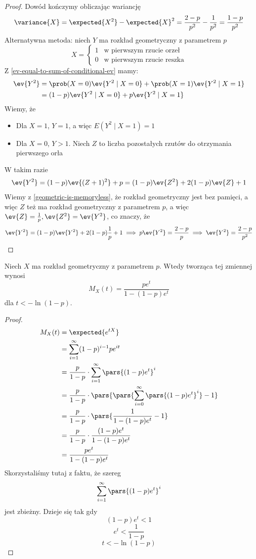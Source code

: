 \begin{proof}
	Dowód kończymy obliczając wariancję
	\[
		\variance{X} = \expected{X^2} - \expected{X}^2 = \frac{2-p}{p^2} - \frac{1}{p^2} = \frac{1-p}{p^2}
	\]
	Alternatywna metoda: niech \(Y\) ma rozkład geometryczny z parametrem \(p\)
	\[
		X = \begin{cases}
			1 & \text{w pierwszym rzucie orzeł}  \\
			0 & \text{w pierwszym rzucie reszka}
		\end{cases}
	\]
	Z \ref{ev-equal-to-sum-of-conditional-ev} mamy:
	\begin{align*}
		\ev{Y^2}
		 & = \prob(X = 0) \ev{Y^2 \mid X = 0} + \prob(X = 1) \ev{Y^2 \mid X = 1} \\
		 & = (1-p)\ev{Y^2 \mid X = 0} + p\ev{Y^2 \mid X = 1}                     \\
	\end{align*}
	Wiemy, że
	\begin{itemize}
		\item Dla \(X = 1\), \(Y = 1\), a więc \(E(Y^2 \mid X = 1) = 1\)
		\item Dla \(X = 0\), \(Y > 1\). Niech \(Z\) to liczba pozostałych rzutów do otrzymania pierwszego orła
	\end{itemize}
	W takim razie
	\[
		\ev{Y^2} = (1-p)\ev{(Z + 1)^2} + p = (1-p)\ev{Z^2} + 2(1-p)\ev{Z} + 1
	\]
	Wiemy z \ref{geometric-is-memoryless}, że rozkład geometryczny jest bez pamięci, a więc \(Z\) też ma rozkład geometryczny z parametrem \(p\), a więc \(\ev{Z} = \frac{1}{p}, \ev{Z^2} = \ev{Y^2}\), co znaczy, że
	\[
		\ev{Y^2} = (1-p)\ev{Y^2} + 2(1-p)\frac{1}{p} + 1 \implies p\ev{Y^2} = \frac{2-p}{p} \implies \ev{Y^2} = \frac{2-p}{p^2}
	\]
\end{proof}

\begin{theorem}
	Niech \( X \) ma rozkład geometryczny z parametrem \( p \). Wtedy tworząca tej zmiennej wynosi
	\[
		M_X(t) = \frac{pe^t}{1 - (1-p)e^t}
	\]
	dla \( t < -\ln (1-p) \).
\end{theorem}

\begin{proof}
	\begin{align*}
		M_X(t)
		 & = \expected{e^{tX}}                                                         \\
		 & = \sum_{i=1}^\infty (1-p)^{i-1}pe^{it}                                      \\
		 & = \frac{p}{1 - p} \cdot \sum_{i=1}^\infty \pars{(1-p)e^t}^i                 \\
		 & = \frac{p}{1-p} \cdot \pars{\pars{\sum_{i=0}^\infty \pars{(1-p)e^t}^i} - 1} \\
		 & = \frac{p}{1-p} \cdot \pars{\frac{1}{1 - (1-p)e^t} - 1}                     \\
		 & = \frac{p}{1-p} \cdot \frac{(1-p)e^t}{1 - (1-p)e^t}                         \\
		 & = \frac{pe^t}{1 - (1-p)e^t}
	\end{align*}
	Skorzystaliśmy tutaj z faktu, że szereg \[ \sum_{i=1}^\infty \pars{(1-p)e^t}^i \]
	jest zbieżny. Dzieje się tak gdy
	\[
		(1-p)e^t < 1
	\]
	\[
		e^t < \frac{1}{1-p}
	\]
	\[
		t < -\ln (1-p)
	\]
\end{proof}

